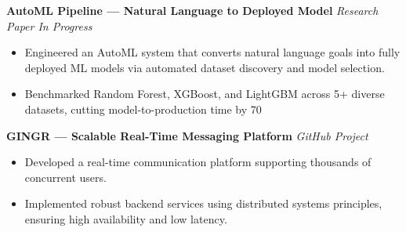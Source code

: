 \documentclass[10pt, a4paper]{article}
\begin{document}
\vspace{4pt}

\textbf{AutoML Pipeline — Natural Language to Deployed Model} \hfill \textit{Research Paper In Progress}
\begin{itemize}[label=$\circ$, itemsep=1pt]
    \item Engineered an AutoML system that converts natural language goals into fully deployed ML models via automated dataset discovery and model selection.
    \item Benchmarked Random Forest, XGBoost, and LightGBM across 5+ diverse datasets, cutting model-to-production time by 70%
\end{itemize}

\vspace{4pt}

\textbf{GINGR — Scalable Real-Time Messaging Platform} \hfill \textit{GitHub Project}
\begin{itemize}[label=$\circ$, itemsep=0pt]
    \item Developed a real-time communication platform supporting thousands of concurrent users.
    \item Implemented robust backend services using distributed systems principles, ensuring high availability and low latency.
\end{itemize}

\end{document}
